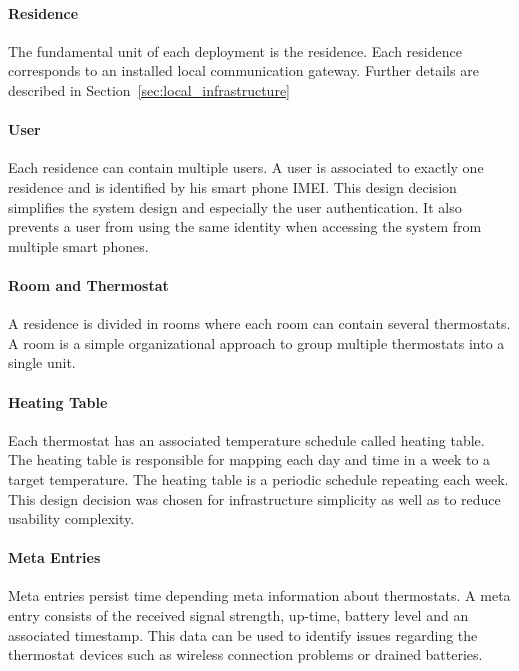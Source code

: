 \paragraph{Residence}

The fundamental unit of each deployment is the residence. Each residence corresponds to an installed local communication gateway. Further details are described in Section~\ref{sec:local_infrastructure}

\paragraph{User}

Each residence can contain multiple users. A user is associated to exactly one residence and is identified by his smart phone IMEI. This design decision simplifies the system design and especially the user authentication. It also prevents a user from using the same identity when accessing the system from multiple smart phones.

\paragraph{Room and Thermostat}
A residence is divided in rooms where each room can contain several thermostats. A room is a simple organizational approach to group multiple thermostats into a single unit.

\paragraph{Heating Table}

Each thermostat has an associated temperature schedule called heating table.
The heating table is responsible for mapping each day and time in a week to a target temperature. The heating table is a periodic schedule repeating each week.
This design decision was chosen for infrastructure simplicity as well as to reduce usability complexity.

\paragraph{Meta Entries}

Meta entries persist time depending meta information about thermostats. A meta entry consists of the received signal strength, up-time, battery level and an associated timestamp. This data can be used to identify issues regarding the thermostat devices such as wireless connection problems or drained batteries.